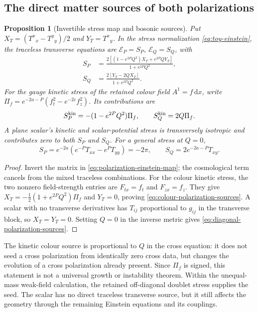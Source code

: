 \documentclass[11pt,a4paper,oneside]{book}
\theoremstyle{plain}
\newtheorem{proposition}[theorem]{Proposition}
\theoremstyle{definition}
\theoremstyle{remark}
\newcommand{\dd}{\mathrm d}
\newcommand{\src}[2]{\cite{#1}}
\begin{document}
\subsection{The direct matter sources of both polarizations}
\begin{proposition}[Invertible stress map and bosonic sources]
\label{prop:polarization-sources}
Put $X_T=(T^x{}_x-T^y{}_y)/2$ and $Y_T=T^x{}_y$.  In the stress
normalization \eqref{eq:toy-einstein}, the traceless transverse equations
are $\mathcal E_P=S_P$, $\mathcal E_Q=S_Q$, with
\begin{equation}
 \begin{aligned}
 S_P&=\frac{2[(1-e^{2P}Q^2)X_T+e^{2P}QY_T]}{1+e^{2P}Q^2},\\
 S_Q&=\frac{2[Y_T-2QX_T]}{1+e^{2P}Q^2}.
 \end{aligned}
 \label{eq:polarization-source-map}
\end{equation}
For the gauge kinetic stress of the retained colour field $A^1=f\,\dd x$,
write $\Pi_f=e^{-2a-P}(f_t^2-e^{-2c}f_z^2)$.  Its contributions are
\begin{equation}
 S_P^{\rm kin}=-(1-e^{2P}Q^2)\Pi_f,\qquad
 S_Q^{\rm kin}=2Q\Pi_f.
 \label{eq:colour-polarization-sources}
\end{equation}
A plane scalar's kinetic and scalar-potential stress is transversely
isotropic and contributes zero to both $S_P$ and $S_Q$.  For a general
stress at $Q=0$,
\begin{equation}
 S_P=e^{-2a}(e^{-P}T_{xx}-e^PT_{yy})=-2\pi,
 \qquad S_Q=2e^{-2a-P}T_{xy}.
 \label{eq:diagonal-polarization-sources}
\end{equation}
\end{proposition}
\begin{proof}
Invert the matrix in \eqref{eq:polarization-einstein-map}; the
cosmological term cancels from the mixed traceless combinations.
For the colour kinetic stress, the two nonzero field-strength entries
are $F_{tx}=f_t$ and $F_{zx}=f_z$.  They give
$X_T=-\tfrac12(1+e^{2P}Q^2)\Pi_f$ and $Y_T=0$, proving
\eqref{eq:colour-polarization-sources}.  A scalar with no transverse
derivatives has $T_{ij}$ proportional to $g_{ij}$ in the transverse
block, so $X_T=Y_T=0$.  Setting $Q=0$ in the inverse metric gives
\eqref{eq:diagonal-polarization-sources}.
\end{proof}
\src{R20}{thm:v20v39-map,thm:v20v39-general}

The kinetic colour source is proportional to $Q$ in the cross equation:
it does not seed a cross polarization from identically zero cross data,
but changes the evolution of a cross polarization already present.
Since $\Pi_f$ is signed, this statement is not a universal growth or
instability theorem.  Within the unequal-mass weak-field calculation,
the retained off-diagonal doublet stress supplies the seed.  The scalar
has no direct traceless transverse source, but it still affects the
geometry through the remaining Einstein equations and its couplings.
\end{document}
